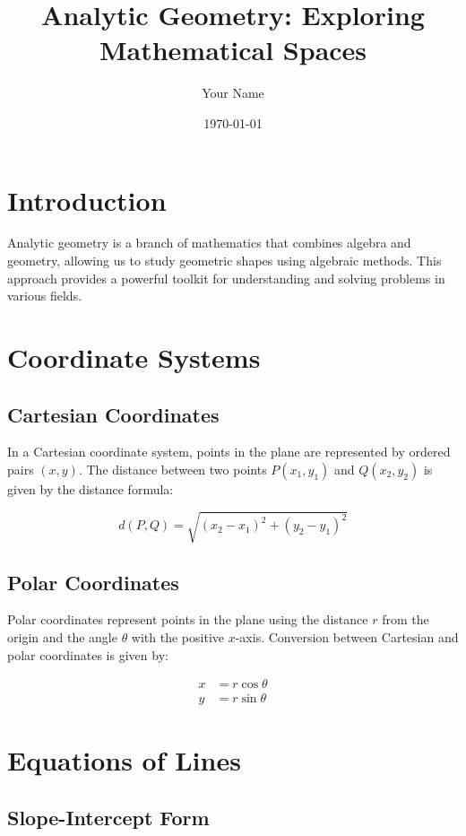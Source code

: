 \documentclass{article}
\title{Analytic Geometry: Exploring Mathematical Spaces}
\author{Your Name}
\date{\today}
\begin{document}
\maketitle

\section{Introduction}

Analytic geometry is a branch of mathematics that combines algebra and geometry, allowing us to study geometric shapes using algebraic methods. This approach provides a powerful toolkit for understanding and solving problems in various fields.

\section{Coordinate Systems}

\subsection{Cartesian Coordinates}

In a Cartesian coordinate system, points in the plane are represented by ordered pairs $(x, y)$. The distance between two points $P(x_1, y_1)$ and $Q(x_2, y_2)$ is given by the distance formula:

\begin{equation}
    d(P, Q) = \sqrt{(x_2 - x_1)^2 + (y_2 - y_1)^2}
\end{equation}

\subsection{Polar Coordinates}

Polar coordinates represent points in the plane using the distance $r$ from the origin and the angle $\theta$ with the positive $x$-axis. Conversion between Cartesian and polar coordinates is given by:

\begin{align}
    x &= r \cos \theta \\
    y &= r \sin \theta
\end{align}

\section{Equations of Lines}

\subsection{Slope-Intercept Form}
\end{document}
